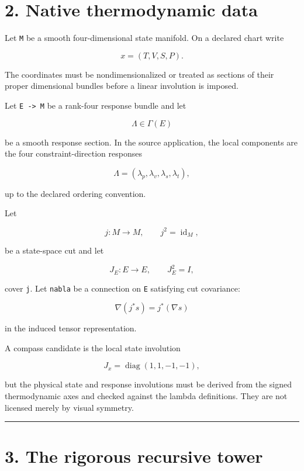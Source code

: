 \hypertarget{native-thermodynamic-data}{%
\section{2. Native thermodynamic data}\label{native-thermodynamic-data}}

Let \texttt{M} be a smooth four-dimensional state manifold. On a declared chart write

\[
x=(T,V,S,P).
\]

The coordinates must be nondimensionalized or treated as sections of their
proper dimensional bundles before a linear involution is imposed.

Let \texttt{E\ -\textgreater{}\ M} be a rank-four response bundle and let

\[
\Lambda\in\Gamma(E)
\]

be a smooth response section. In the source application, the local components
are the four constraint-direction responses

\[
\Lambda=(\lambda_p,\lambda_v,\lambda_s,\lambda_t),
\]

up to the declared ordering convention.

Let

\[
j:M\longrightarrow M,
\qquad j^2=\operatorname{id}_M,
\]

be a state-space cut and let

\[
J_E:E\longrightarrow E,
\qquad J_E^2=I,
\]

cover \texttt{j}. Let \texttt{nabla} be a connection on \texttt{E} satisfying cut covariance:

\[
\boxed{
\nabla(j^*s)=j^*(\nabla s)
}
\tag{2.1}
\]

in the induced tensor representation.

A compass candidate is the local state involution

\[
J_x=\operatorname{diag}(1,1,-1,-1),
\tag{2.2}
\]

but the physical state and response involutions must be derived from the
signed thermodynamic axes and checked against the lambda definitions. They are
not licensed merely by visual symmetry.

\begin{center}\rule{0.5\linewidth}{0.5pt}\end{center}

\hypertarget{the-rigorous-recursive-tower}{%
\section{3. The rigorous recursive tower}\label{the-rigorous-recursive-tower}}

